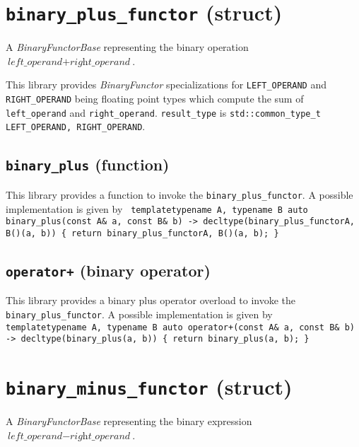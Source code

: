 \documentclass[oneside]{book}
\begin{document}


\section{\texttt{binary\_plus\_functor} (struct)}
A \textit{BinaryFunctorBase} representing the binary operation $\textit{left\_operand} + \textit{right\_operand}$.\newline

\noindent{}This library provides \textit{BinaryFunctor}       specializations for
\texttt{LEFT\_OPERAND} and \texttt{RIGHT\_OPERAND} being     floating point types
which compute  the sum    of  \texttt{left\_operand} and \texttt{right\_operand}.
\texttt{result\_type} is \texttt{std::common\_type\_t  \textlangle LEFT\_OPERAND,
RIGHT\_OPERAND\textrangle}.

\subsection{\texttt{binary\_plus} (function)}
This library provides a function to invoke the \texttt{binary\_plus\_functor}.
A possible implementation is given by\newline
\texttt{
template\textlangle typename A, typename B\textrangle\newline
auto binary\_plus(const A\& a, const B\& b) -> decltype(binary\_plus\_functor\textlangle A, B\textrangle()(a, b))\newline
\{ return binary\_plus\_functor\textlangle A, B\textrangle()(a, b); \}
}

\subsection{\texttt{operator+} (binary operator)}
This library provides a binary plus operator overload to invoke the \texttt{binary\_plus\_functor}.
A possible implementation is given by\newline
\texttt{
template\textlangle typename A, typename B\textrangle\newline
auto operator+(const A\& a, const B\& b) -> decltype(binary\_plus(a, b))\newline
\{ return binary\_plus(a, b); \}
}

\section{\texttt{binary\_minus\_functor} (struct)}
A \textit{BinaryFunctorBase} representing the binary expression $\textit{left\_operand} - \textit{right\_operand}$.\newline
\end{document}
